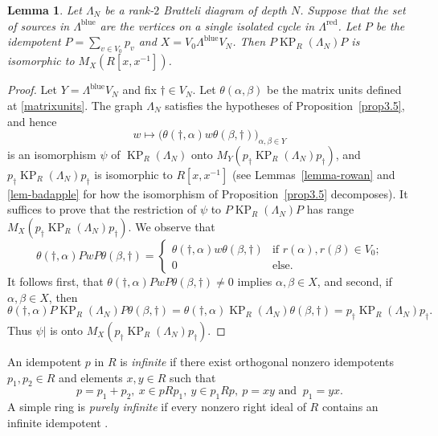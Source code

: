 \documentclass[a4paper,12pt]{amsart}
\numberwithin{equation}{section}
\newtheorem{lemma}[thm]{Lemma}
\theoremstyle{definition}
\theoremstyle{remark}
\begin{document}
\begin{lemma}\label{lem-restrict-iso}
 Let $\Lambda_N$ be a rank-$2$ Bratteli diagram of depth $N$.  Suppose that the set of sources in $\Lambda^{{\operatorname{\mathrm{blue}}}}$ are the vertices on a single isolated cycle in $\Lambda^{{\operatorname{\mathrm{red}}}}$.  Let $P$ be the idempotent $P=\sum_{v\in V_0}p_v$ and $X=V_0\Lambda^{{\operatorname{\mathrm{blue}}}} V_N$. Then $P\operatorname{KP}_R(\Lambda_N)P$ is isomorphic to $M_X(R[x,x^{-1}])$.
\end{lemma}

\begin{proof}  Let $Y=\Lambda^{{\operatorname{\mathrm{blue}}}} V_N$ and fix $\dagger\in V_N$. Let $\theta(\alpha, \beta)$ be the matrix units defined at \eqref{matrixunits}. The graph $\Lambda_N$ satisfies the hypotheses of Proposition~\ref{prop3.5}, and hence \[w\mapsto \big( \theta(\dagger, \alpha)w\theta(\beta,\dagger )\big)_{\alpha,\beta\in Y}\] is an isomorphism $\psi$ of $\operatorname{KP}_R(\Lambda_N)$ onto $M_Y(p_\dagger\operatorname{KP}_R(\Lambda_N)p_\dagger)$, and $p_\dagger\operatorname{KP}_R(\Lambda_N)p_\dagger$ is isomorphic to $R[x,x^{-1}]$ (see Lemmas~\ref{lemma-rowan} and \ref{lem-badapple} for how the isomorphism of Proposition~\ref{prop3.5} decomposes).  It suffices to prove  that the restriction of $\psi$ to $P\operatorname{KP}_R(\Lambda_N)P$ has range $M_X(p_\dagger\operatorname{KP}_R(\Lambda_N)p_\dagger)$.
We observe that \[\theta(\dagger,\alpha)PwP\theta(\beta,\dagger)=\begin{cases} \theta(\dagger,\alpha)w\theta(\beta,\dagger)&\text{if $r(\alpha), r(\beta)\in V_0$;}\\0&\text{else}. \end{cases}\] 
It follows first, that $\theta(\dagger,\alpha)PwP\theta(\beta,\dagger)\neq 0$ implies $\alpha,\beta\in X$, and second, if $\alpha,\beta\in X$, then \[\theta(\dagger,\alpha)P\operatorname{KP}_R(\Lambda_N)P\theta(\beta,\dagger)=\theta(\dagger,\alpha)\operatorname{KP}_R(\Lambda_N)\theta(\beta,\dagger)=p_\dagger\operatorname{KP}_R(\Lambda_N)p_\dagger.\]
Thus $\psi|$ is onto $M_X(p_\dagger\operatorname{KP}_R(\Lambda_N)p_\dagger)$.
\end{proof} 

An idempotent $p$ in $R$ is \emph{infinite} if there exist orthogonal nonzero idempotents $p_1, p_2 \in R$
and elements $x,y \in R$ such that
\[p=p_1+p_2,  \ x \in pRp_1,\   y \in p_1Rp,\ p=xy \text{ and } \ p_1=yx.\]  A simple ring is
\emph{purely infinite} if every nonzero right ideal of $R$ contains an infinite idempotent \cite[\S1]{AGP}.
\end{document}
